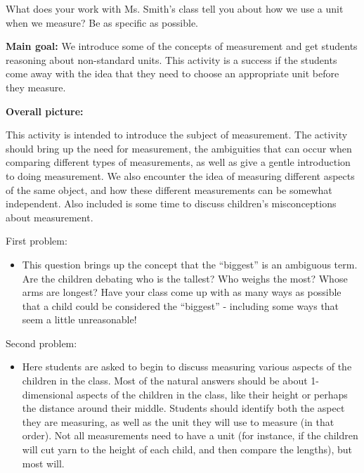\documentclass[nooutcomes,noauthor, handout]{ximera}
\begin{document}
\begin{problem}

What does your work with Ms. Smith's class tell you about how we use a unit when we measure? Be as specific as possible.
   
\end{problem}


\newpage

\begin{instructorNotes}

{\bf Main goal:} We introduce some of the concepts of measurement and get students reasoning about non-standard units. This activity is a success if the students come away with the idea that they need to choose an appropriate unit before they measure.

{\bf Overall picture:}

This activity is intended to introduce the subject of measurement.  The activity should bring up the need for measurement, the ambiguities that can occur when comparing different types of measurements, as well as give a gentle introduction to doing measurement.  We also encounter the idea of measuring different aspects of the same object, and how these different measurements can be somewhat independent.  Also included is some time to discuss children's misconceptions about measurement.

First problem:
\begin{itemize}
	\item         This question brings up the concept that the ``biggest'' is an ambiguous term.  Are the children debating who is the tallest?  Who weighs the most?  Whose arms are longest?  Have your class come up with as many ways as possible that a child could be considered the ``biggest'' - including some ways that seem a little unreasonable!
\end{itemize}


Second problem:
\begin{itemize}
 \item Here students are asked to begin to discuss measuring various aspects of the children in the class.  Most of the natural answers should be about 1-dimensional aspects of the children in the class, like their height or perhaps the distance around their middle.  Students should identify both the aspect they are measuring, as well as the unit they will use to measure (in that order).  Not all measurements need to have a unit (for instance, if the children will cut yarn to the height of each child, and then compare the lengths), but most will.  
        

\end{itemize}
\end{instructorNotes}
\end{document}
